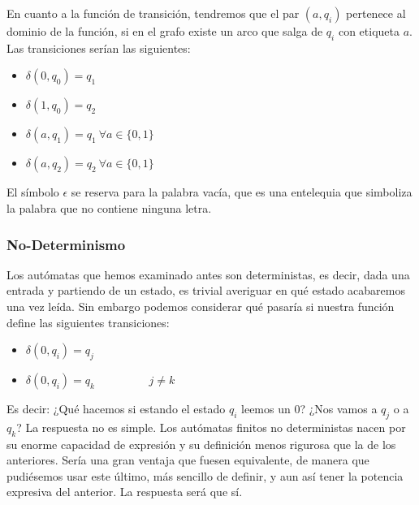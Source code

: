 En cuanto a la función de transición, tendremos que el par $(a,q_i)$ pertenece al dominio de la función, si en el grafo existe un arco que salga de $q_i$ con etiqueta $a$. Las transiciones serían las siguientes:

\begin{multicols}{2}
	\begin{itemize}
		\item $\delta(0,q_0)=q_1$
		\item $\delta(1,q_0)=q_2$
		\item $\delta(a,q_1)=q_1 \ \forall a \in \{0,1\}$
		\item $\delta(a,q_2)=q_2 \ \forall a \in \{0,1\}$
	\end{itemize}
\end{multicols}

El símbolo $\epsilon$ se reserva para la palabra vacía, que es una entelequia que simboliza la palabra que no contiene ninguna letra.





\subsubsection{No-Determinismo}

Los autómatas que hemos examinado antes son deterministas, es decir, dada una entrada y partiendo de un estado, es trivial averiguar en qué estado acabaremos una vez leída. Sin embargo podemos considerar qué pasaría si nuestra función define las siguientes transiciones:

\begin{multicols}{2}
	\begin{itemize}
		\item $\delta(0,q_i)=q_j$
		\item $\delta(0,q_i)=q_k \hspace{2cm} j\neq k$
	\end{itemize}
\end{multicols}


Es decir: ¿Qué hacemos si estando el estado $q_i$ leemos un $0$? ¿Nos vamos a $q_j$ o a $q_k$? La respuesta no es simple. Los autómatas finitos no deterministas nacen por su enorme capacidad de expresión y su definición menos rigurosa que la de los anteriores. Sería una gran ventaja que fuesen equivalente, de manera que pudiésemos usar este último, más sencillo de definir, y aun así tener la potencia expresiva del anterior. La respuesta será que sí. 

